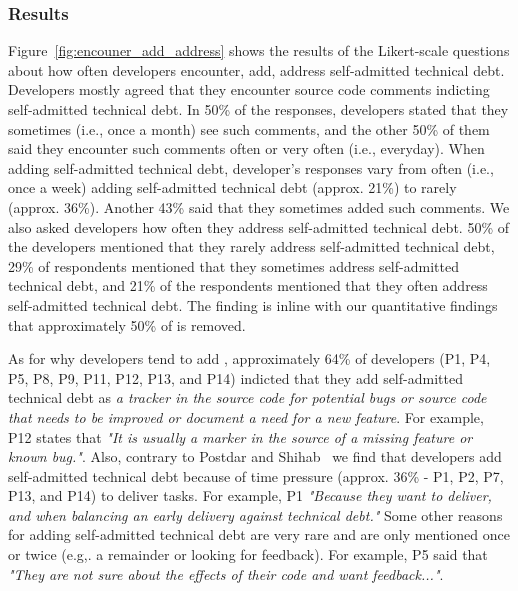 \subsubsection*{Results} 
Figure~\ref{fig:encouner_add_address} shows the results of the Likert-scale questions about how often developers encounter, add, address self-admitted technical debt. Developers mostly agreed that they encounter source code comments indicting self-admitted technical debt. In 50\% of the responses, developers stated that they sometimes (i.e., once a month) see such comments, and the other 50\% of them said they encounter such comments often or very often (i.e., everyday). When adding self-admitted technical debt, developer's responses vary from often (i.e., once a week) adding self-admitted technical debt (approx. 21\%) to rarely (approx. 36\%). Another 43\% said that they sometimes added such comments. We also asked developers how often they address self-admitted technical debt. 50\% of the developers mentioned that they rarely address self-admitted technical debt, 29\% of respondents mentioned that they sometimes address self-admitted technical debt, and 21\% of the respondents mentioned that they often address self-admitted technical debt. The finding is inline with our quantitative findings that approximately 50\% of \SATD is removed.

As for why developers tend to add \SATD, approximately 64\% of developers (P1, P4, P5, P8, P9, P11, P12, P13, and P14) indicted that they add self-admitted technical debt as \emph{a tracker in the source code for potential bugs or source code that needs to be improved or document a need for a new feature}. For example, P12 states that \textit{"It is usually a marker in the source of a missing feature or known bug."}. Also, contrary to Postdar and Shihab~\cite{Potdar2014ICSME} we find that developers add self-admitted technical debt because of time pressure (approx. 36\% - P1, P2, P7, P13, and P14) to deliver tasks. For example, P1 \textit{"Because they want to deliver, and when balancing an early delivery against technical debt."} Some other reasons for adding self-admitted technical debt are very rare and are only mentioned once or twice (e.g,. a remainder or looking for feedback). For example, P5 said that \textit{"They are not sure about the effects of their code and want feedback..."}.

